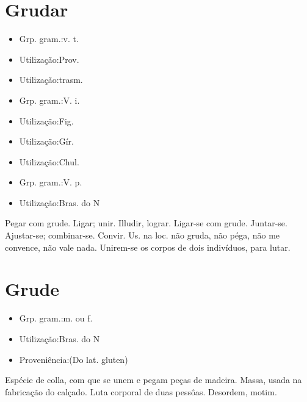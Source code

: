 \section{Grudar}
\begin{itemize}
\item {Grp. gram.:v. t.}
\end{itemize}
\begin{itemize}
\item {Utilização:Prov.}
\end{itemize}
\begin{itemize}
\item {Utilização:trasm.}
\end{itemize}
\begin{itemize}
\item {Grp. gram.:V. i.}
\end{itemize}
\begin{itemize}
\item {Utilização:Fig.}
\end{itemize}
\begin{itemize}
\item {Utilização:Gír.}
\end{itemize}
\begin{itemize}
\item {Utilização:Chul.}
\end{itemize}
\begin{itemize}
\item {Grp. gram.:V. p.}
\end{itemize}
\begin{itemize}
\item {Utilização:Bras. do N}
\end{itemize}
Pegar com grude.
Ligar; unir.
Illudir, lograr.
Ligar-se com grude.
Juntar-se.
Ajustar-se; combinar-se.
Convir.
Us. na loc. \textunderscore não gruda\textunderscore , não péga, não me convence, não vale nada.
Unirem-se os corpos de dois indivíduos, para lutar.
\section{Grude}
\begin{itemize}
\item {Grp. gram.:m.  ou  f.}
\end{itemize}
\begin{itemize}
\item {Utilização:Bras. do N}
\end{itemize}
\begin{itemize}
\item {Proveniência:(Do lat. \textunderscore gluten\textunderscore )}
\end{itemize}
Espécie de colla, com que se unem e pegam peças de madeira.
Massa, usada na fabricação do calçado.
Luta corporal de duas pessôas.
Desordem, motim.

